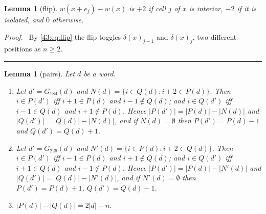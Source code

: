 \documentclass[10pt,a4paper]{article}
\newtheorem{lemma}[theorem]{Lemma}
\newcommand{\qedmark}{\rule{1.1ex}{1.1ex}}
\newenvironment{proof}[1][Proof]{\par\smallskip\noindent\textit{#1.}\ }{\hfill\qedmark\par\smallskip}
\begin{document}
\begin{lemma}[flip]\label{43:lem:flip}
$w(x+e_j)-w(x)$ is $+2$ if cell $j$ of $x$ is interior, $-2$ if it is isolated, and $0$ otherwise.
\end{lemma}
\begin{proof}
By \eqref{43:eq:flip} the flip toggles $\delta(x)_{j-1}$ and $\delta(x)_j$, two different positions as $n\ge 2$.
\end{proof}

\begin{lemma}[pairs]\label{43:lem:pairs}
Let $d$ be a word.
\begin{enumerate}[label=(\alph*),nosep,leftmargin=*]
\item Let $d'=G_{184}(d)$ and $N(d)=\{i\in Q(d): i+2\in P(d)\}$. Then
$i\in P(d')$ iff $i+1\in P(d)$ and $i-1\notin Q(d)$; and $i\in Q(d')$ iff $i-1\in Q(d)$ and $i+1\notin P(d)$.
Hence $|P(d')|=|P(d)|-|N(d)|$ and $|Q(d')|=|Q(d)|-|N(d)|$, and if $N(d)=\emptyset$ then $P(d')=P(d)-1$ and
$Q(d')=Q(d)+1$.
\item Let $d'=G_{226}(d)$ and $N'(d)=\{i\in P(d): i+2\in Q(d)\}$. Then
$i\in P(d')$ iff $i-1\in P(d)$ and $i+1\notin Q(d)$; and $i\in Q(d')$ iff $i+1\in Q(d)$ and $i-1\notin P(d)$.
Hence $|P(d')|=|P(d)|-|N'(d)|$ and $|Q(d')|=|Q(d)|-|N'(d)|$, and if $N'(d)=\emptyset$ then $P(d')=P(d)+1$,
$Q(d')=Q(d)-1$.
\item $|P(d)|-|Q(d)|=2|d|-n$.
\end{enumerate}
\end{lemma}
\end{document}
